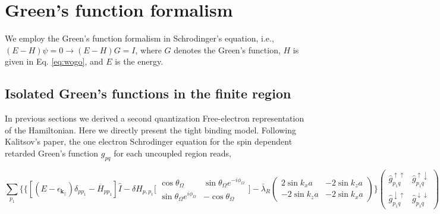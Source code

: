 \documentclass[10pt,prb,showpacs,amssymb,floatfix]{revtex4-1}
\newcommand{\dna}{\downarrow}
\newcommand{\upa}{\uparrow}
\newcommand{\dlt}{\delta}
\newcommand{\eps}{\epsilon}
\newcommand{\Og}{\Omega}
\begin{document}
\section{Green's function formalism}

We employ the Green's function formalism in Schrodinger's equation, i.e., $(E-H)\psi=0 \rightarrow (E-H)G=I$, where $G$ denotes the Green's function, $H$ is given in Eq. \eqref{eq:wogo}, and $E$ is the energy. 

\subsection{Isolated Green's functions in the finite region}
In previous sections we derived a second quantization Free-electron representation of the Hamiltonian. Here we directly present the tight binding model. Following Kalitsov's paper,\cite{kalitsov} the one electron Schrodinger equation for the spin dependent retarded Green's function $g_{pq}$ for each uncoupled region reads,

\begin{equation}
\sum_{p_1} \Bigg \{ \bigg\{ [(E-\eps_{\bm{k}_{||}})\dlt_{pp_1}-\overline{H}_{pp_1}]\hat{I}-\dlt H_{p,p_1} \bigg[\begin{array}{ccc}\cos\theta_\Og & \sin\theta_\Og e^{-i\phi_\Og} \\
\sin\theta_\Og e^{i\phi_\Og} & -\cos\theta_\Og 
 \end{array} \bigg] -  \bar{\lambda}_{R} \left(\begin{array}{cc} 
2\sin k_xa  &  -2\sin k_za\\
-2\sin k_za &  -2\sin k_xa
\end{array}\right) \bigg \} \left(\begin{array}{cc} \hat{g}^{\upa\upa}_{p_1q}  &  \hat{g}^{\upa\dna}_{p_1q} \\  \hat{g}^{\dna\upa}_{p_1q} &  \hat{g}^{\dna\dna}_{p_1q} \end{array}\right)  \Bigg \}=\dlt_{pq}\hat{I}.
 \label{tbschrodinger}
\end{equation}
\end{document}
